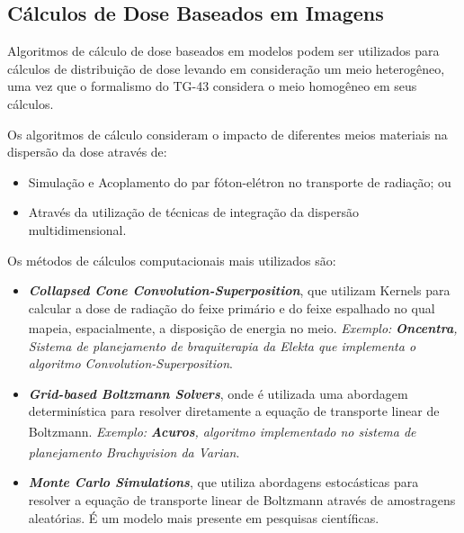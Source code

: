\documentclass[11pt,a4paper]{article}
\begin{document}
		\subsection{Cálculos de Dose Baseados em Imagens}

			Algoritmos de cálculo de dose baseados em modelos podem ser utilizados para cálculos de distribuição de dose levando em consideração um meio heterogêneo, uma vez que o formalismo do TG-43 considera o meio homogêneo em seus cálculos.
			
			Os algoritmos de cálculo consideram o impacto de diferentes meios materiais na dispersão da dose através de:

				\begin{itemize}
					\item Simulação e Acoplamento do par fóton-elétron no transporte de radiação; ou
					\item Através da utilização de técnicas de integração da dispersão multidimensional.
				\end{itemize}
			
			Os métodos de cálculos computacionais mais utilizados são:

				\begin{itemize}
					\item \textbf{\textit{\textcolor{CarnationPink}{Collapsed Cone Convolution-Superposition}}}, que utilizam Kernels para calcular a dose de radiação do feixe primário e do feixe espalhado no qual mapeia, espacialmente, a disposição de energia no meio. \textit{Exemplo:} \textit{\textbf{Oncentra\textsuperscript{\textregistered}}, Sistema de planejamento de braquiterapia da Elekta que implementa o algoritmo Convolution-Superposition}.
					
					\item \textbf{\textit{\textcolor{CarnationPink}{Grid-based Boltzmann Solvers}}}, onde é utilizada uma abordagem determinística para resolver diretamente a equação de transporte linear de Boltzmann. \textit{Exemplo:} \textit{\textbf{Acuros\textsuperscript{\textregistered}}, algoritmo implementado no sistema de planejamento Brachyvision\textsuperscript{\textregistered} da Varian}.
					
					\item \textbf{\textit{\textcolor{CarnationPink}{Monte Carlo Simulations}}}, que utiliza abordagens estocásticas para resolver a equação de transporte linear de Boltzmann através de amostragens aleatórias. É um modelo mais presente em pesquisas científicas.
					
					\end{itemize}
		
\end{document}
